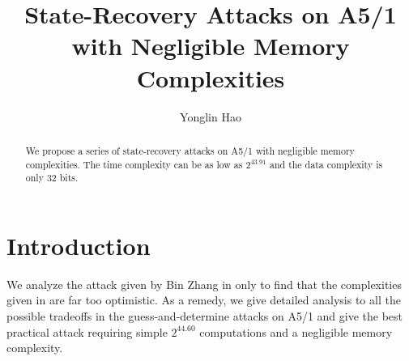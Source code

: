 

        
\mainmatter
\title{State-Recovery Attacks on A5/1 with Negligible Memory Complexities}
\author{Yonglin Hao}
\maketitle


%




\begin{abstract}
We propose a series of state-recovery attacks on A5/1 with negligible memory complexities.
The time complexity can be as low as $2^{43.91}$ and the data complexity is only 32 bits.
\end{abstract}

\section{Introduction}
We analyze the attack given by Bin Zhang in \cite{AC:Zhang19} only to find that the complexities given in \cite{AC:Zhang19} are far too optimistic.
As a remedy, we give detailed analysis to all the possible tradeoffs in the guess-and-determine attacks on A5/1 and give the best practical attack requiring simple $2^{44.60}$ computations and a negligible memory complexity.



